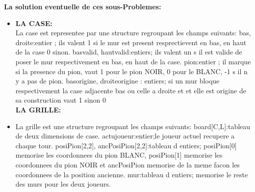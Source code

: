 \documentclass[a4paper, draft]{article}
\begin{document}
\textbf{La solution eventuelle de ces sous-Problemes:}\\
\begin{itemize}
\item \textbf{LA CASE:}\\
La case est representee par une structure regroupant les champs suivants:\newline
bas, droite:entier ; ils valent 1 si le mur est present resprectievent en bas, en haut de la case 0 sinon.\newline
basvalid, hautvalid:entiers; ils valent un s il est valide de poser le mur respectivement en bas, en haut de la case.\newline
pion:entier ; il marque si la presence du pion, vaut 1 pour le pion NOIR, 0 pour le BLANC, -1 s il n y a pas de pion.\newline
basorigine, droiteorigine : entiers; si un mur bloque respectivement la case adjacente bas ou celle a droite et et  elle est origine de sa construction vaut 1 sinon 0 \\

\textbf{LA GRILLE:}
\item  La grille est une structure regroupant les champs suivants:\newline
board[C,L]:tableau de deux dimensions de case. \newline
actujoueur:entier;le joueur actuel recupere a chaque tour.\newline
posiPion[2,2], ancPosiPion[2,2]:tableau d entiers; posiPion[0] memorise les coordonnees du pion BLANC, posiPion[1] memorise les coordonnees du pion NOIR et ancPosiPion memorise de la meme facon les coordonnees de la position ancienne.\newline
mur:tableau d entiers; memorise le reste des murs pour les deux joueurs.\newline
\end{itemize}
\end{document}
